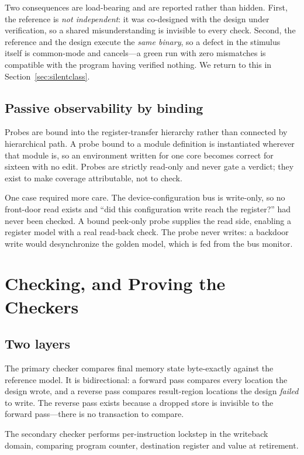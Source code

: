 \documentclass[conference]{IEEEtran}
\begin{document}
Two consequences are load-bearing and are reported rather than hidden.
First, the reference is \emph{not independent}: it was co-designed with
the design under verification, so a shared misunderstanding is invisible
to every check. Second, the reference and the design execute the
\emph{same binary}, so a defect in the stimulus itself is common-mode and
cancels---a green run with zero mismatches is compatible with the program
having verified nothing. We return to this in
Section~\ref{sec:silentclass}.

\subsection{Passive observability by binding}
Probes are bound into the register-transfer hierarchy rather than
connected by hierarchical path. A probe bound to a module definition is
instantiated wherever that module is, so an environment written for one
core becomes correct for sixteen with no edit. Probes are strictly
read-only and never gate a verdict; they exist to make coverage
attributable, not to check.

One case required more care. The device-configuration bus is write-only,
so no front-door read exists and ``did this configuration write reach the
register?'' had never been checked. A bound peek-only probe supplies the
read side, enabling a register model with a real read-back check. The
probe never writes: a backdoor write would desynchronize the golden model,
which is fed from the bus monitor.

\section{Checking, and Proving the Checkers}
\label{sec:nonvacuity}

\subsection{Two layers}
The primary checker compares final memory state byte-exactly against the
reference model. It is bidirectional: a forward pass compares every
location the design wrote, and a reverse pass compares result-region
locations the design \emph{failed} to write. The reverse pass exists
because a dropped store is invisible to the forward pass---there is no
transaction to compare.

The secondary checker performs per-instruction lockstep in the writeback
domain, comparing program counter, destination register and value at
retirement.
\end{document}
